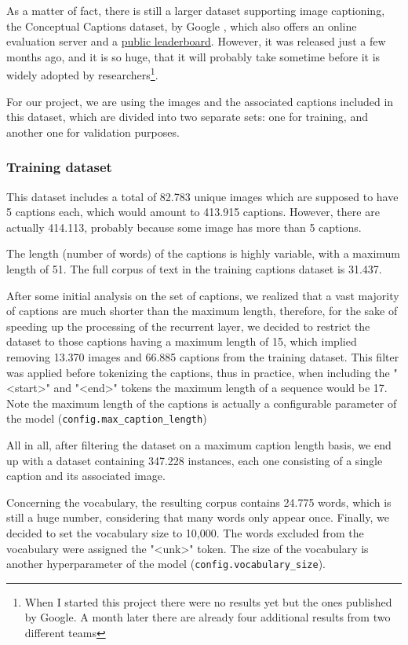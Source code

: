 As a matter of fact, there is still a larger dataset supporting image captioning, the Conceptual Captions dataset, by Google  \citep{Sharma2018}, which also offers an online evaluation server and a \href{https://ai.google.com/research/ConceptualCaptions/leaderboard?active_tab=leaderboard}{public leaderboard}. However, it was released just a few months ago, and it is so huge, that it will probably take sometime before it is widely adopted by researchers\footnote{When I started this project there were no results yet but the ones published by Google. A month later there are already four additional results from two different teams}.

For our project, we are using the images and the associated captions included in this dataset, which are divided into two separate sets: one for training, and another one for validation purposes.

\subsubsection{Training dataset}

This dataset includes a total of 82.783 unique images which are supposed to have 5 captions each, which would amount to 413.915 captions. However, there are actually 414.113, probably because some image has more than 5 captions.

The length (number of words) of the captions is highly variable, with a maximum length of 51. The full corpus of text in the training captions dataset is 31.437.

After some initial analysis on the set of captions, we realized that a vast majority of captions are much shorter than the maximum length, therefore, for the sake of speeding up the processing of the recurrent layer, we decided to restrict the dataset to those captions having a maximum length of 15, which implied removing  13.370 images and 66.885 captions from the training dataset. This filter was applied before tokenizing the captions, thus in practice, when including the "<start>" and "<end>" tokens the maximum length of a sequence would be 17. Note the maximum length of the captions is actually a configurable parameter of the model (\lstinline{config.max_caption_length})

All in all, after filtering the dataset on a maximum caption length basis, we end up with a dataset containing 347.228 instances, each one consisting of a single caption and its associated image.

Concerning the vocabulary, the resulting corpus contains 24.775 words, which is still a huge number, considering that many words only appear once. Finally, we decided to set the vocabulary size to 10,000. The words excluded from the vocabulary were assigned the "<unk>" token. The size of the vocabulary is another hyperparameter of the model (\lstinline{config.vocabulary_size}).

